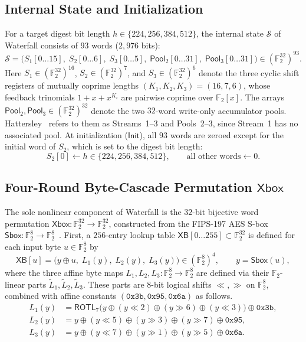 \documentclass[11pt,a4paper]{article}
\theoremstyle{definition}
\theoremstyle{remark}
\newcommand{\Ftwo}{\mathbb{F}_2}
\newcommand{\Xbox}{\mathsf{Xbox}}
\newcommand{\Sbox}{\mathsf{Sbox}}
\newcommand{\Pool}{\mathsf{Pool}}
\begin{document}
\subsection{Internal State and Initialization}
For a target digest bit length $h \in \{224, 256, 384, 512\}$, the internal state $\mathcal{S}$ of Waterfall consists of $93$ words ($2{,}976$ bits):
\begin{equation}
\label{eq:state}
\mathcal{S} = \Big(S_1[0 \dots 15], \; S_2[0 \dots 6], \; S_3[0 \dots 5], \; \Pool_2[0 \dots 31], \; \Pool_3[0 \dots 31]\Big) \in (\Ftwo^{32})^{93}.
\end{equation}
Here $S_1 \in (\Ftwo^{32})^{16}$, $S_2 \in (\Ftwo^{32})^{7}$, and $S_3 \in (\Ftwo^{32})^{6}$ denote the three cyclic shift registers of mutually coprime lengths $(K_1, K_2, K_3) = (16, 7, 6)$, whose feedback trinomials $1 + x + x^{K_i}$ are pairwise coprime over $\Ftwo[x]$. The arrays $\Pool_2, \Pool_3 \in (\Ftwo^{32})^{32}$ denote the two $32$-word write-only accumulator pools. Hattersley~\cite{Hat08} refers to them as Streams~1--3 and Pools~2--3, since Stream~1 has no associated pool. At initialization ($\mathsf{Init}$), all $93$ words are zeroed except for the initial word of $S_2$, which is set to the digest bit length:
\[
S_2[0] \leftarrow h \in \{224, 256, 384, 512\}, \qquad \text{all other words} \leftarrow 0.
\]

\subsection{Four-Round Byte-Cascade Permutation \texorpdfstring{$\Xbox$}{Xbox}}
The sole nonlinear component of Waterfall is the $32$-bit bijective word permutation $\Xbox : \Ftwo^{32} \to \Ftwo^{32}$, constructed from the FIPS-197 AES S-box $\Sbox : \Ftwo^8 \to \Ftwo^8$~\cite{FIPSAES}. First, a $256$-entry lookup table $\mathsf{XB}[0 \dots 255] \subset \Ftwo^{32}$ is defined for each input byte $u \in \Ftwo^8$ by
\begin{equation}
\label{eq:XB-table}
\mathsf{XB}[u] = \big(y \oplus u, \; L_1(y), \; L_2(y), \; L_3(y)\big) \in (\Ftwo^8)^4, \qquad y = \Sbox(u),
\end{equation}
where the three affine byte maps $L_1, L_2, L_3 : \Ftwo^8 \to \Ftwo^8$ are defined via their $\Ftwo$-linear parts $\tilde{L}_1, \tilde{L}_2, \tilde{L}_3$. These parts are $8$-bit logical shifts $\ll, \gg$ on $\Ftwo^8$, combined with affine constants $(\mathtt{0x3b}, \mathtt{0x95}, \mathtt{0x6a})$ as follows.
\[
\begin{aligned}
L_1(y) &= \mathsf{ROTL}_7\big(y \oplus (y \ll 2) \oplus (y \gg 6) \oplus (y \ll 3)\big) \oplus \mathtt{0x3b}, \\
L_2(y) &= y \oplus (y \ll 5) \oplus (y \gg 3) \oplus (y \gg 7) \oplus \mathtt{0x95}, \\
L_3(y) &= y \oplus (y \ll 7) \oplus (y \gg 1) \oplus (y \gg 5) \oplus \mathtt{0x6a}.
\end{aligned}
\]
\end{document}
